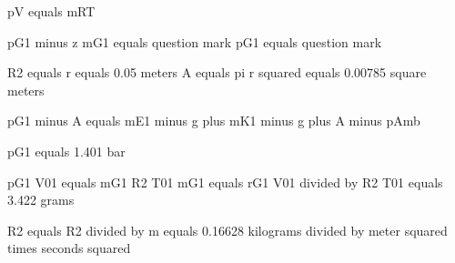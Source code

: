 pV equals mRT

pG1 minus z
mG1 equals question mark
pG1 equals question mark

R2 equals r equals 0.05 meters
A equals pi r squared equals 0.00785 square meters

pG1 minus A equals mE1 minus g plus mK1 minus g plus A minus pAmb

pG1 equals 1.401 bar

pG1 V01 equals mG1 R2 T01
mG1 equals rG1 V01 divided by R2 T01 equals 3.422 grams

R2 equals R2 divided by m equals 0.16628 kilograms divided by meter squared times seconds squared